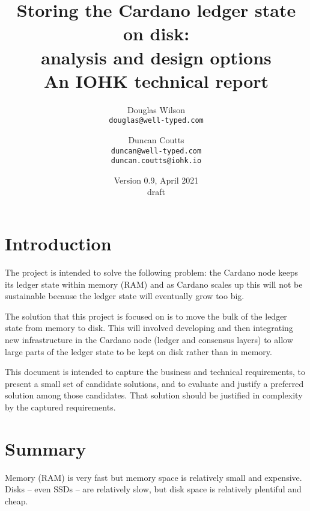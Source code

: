 \documentclass[11pt,a4paper]{article}
\begin{document}
\title{Storing the Cardano ledger state on disk: \\
       analysis and design options \\
       {\large \sc An IOHK technical report}
  }
\date{Version 0.9, April 2021 \\ {\sc draft}}
\author{Douglas Wilson     \\ {\small \texttt{douglas@well-typed.com}} \\
   \and Duncan Coutts      \\ {\small \texttt{duncan@well-typed.com}} \\
                              {\small \texttt{duncan.coutts@iohk.io}}
   }

\maketitle

\section{Introduction}
\label{introduction}

The project is intended to solve the following problem: the Cardano node keeps
its ledger state within memory (RAM) and as Cardano scales up this will not be
sustainable because the ledger state will eventually grow too big.

The solution that this project is focused on is to move the bulk of the ledger
state from memory to disk. This will involved developing and then integrating
new infrastructure in the Cardano node (ledger and consensus layers) to allow
large parts of the ledger state to be kept on disk rather than in memory.

This document is intended to capture the business and technical requirements,
to present a small set of candidate solutions, and to evaluate and justify a
preferred solution among those candidates. That solution should be justified in
complexity by the captured requirements.

\tableofcontents

\listoftodos

\section{Summary}
\label{summary}

Memory (RAM) is very fast but memory space is relatively small and expensive.
Disks -- even SSDs -- are relatively slow, but disk space is relatively
plentiful and cheap.
\end{document}
